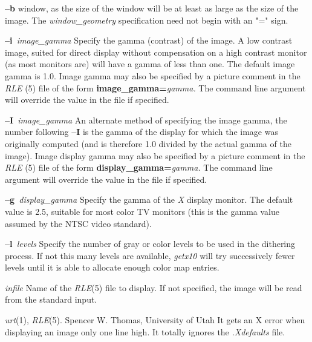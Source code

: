 \begin{TPlist}{{\bf --b}}
window, as the size of the window will be at least as large as the
size of the image.  The
{\it window\_geometry}
specification need not begin with an "=" sign.
\item[{{\bf --i}{\it \ image\_gamma}
}]
Specify the gamma (contrast) of the image.  A low contrast image,
suited for direct display without compensation on a high contrast
monitor (as most monitors are) will have a gamma of less than one.
The default image gamma is 1.0.  Image gamma may also be specified by
a picture comment in the
{\it RLE} (5)
file of the form
{\bf image\_gamma=}{\it gamma.}
The command line argument will override the value in the file if specified.
\item[{{\bf --I}{\it \ image\_gamma}
}]
An alternate method of specifying the image gamma, the number
following
{\bf --I}
is the gamma of the display for which the image was originally
computed (and is therefore 1.0 divided by the actual gamma of the
image).  Image display gamma may also be specified by
a picture comment in the
{\it RLE} (5)
file of the form
{\bf display\_gamma=}{\it gamma.}
The command line argument will override the value in the file if specified.
\item[{{\bf --g}{\it \ display\_gamma}
}]
Specify the gamma of the 
{\it X}
display monitor.  The default value is 2.5, suitable for most color TV
monitors (this is the gamma value assumed by the NTSC video standard).
\item[{{\bf --l}{\it \ levels}
}]
Specify the number of gray or color levels to be used in the dithering
process.  If not this many levels are available,
{\it getx10}
will try successively fewer levels until it is able to allocate enough
color map entries.
\item[{{\it infile}}]
Name of the
{\it RLE}{\rm (5)}
file to display.  If not specified, the image will be read from the
standard input.
\end{TPlist}
{\it urt}{\rm (1),}
{\it RLE}{\rm (5).}
Spencer W. Thomas, University of Utah
It gets an X error when displaying an image only one line high.
It totally ignores the 
{\it .Xdefaults} 
file.

\newpage


%
%
%

